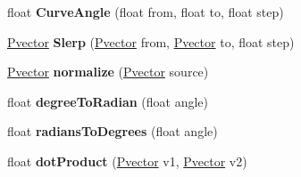 \begin{DoxyCompactItemize}
\item 
float {\bfseries Curve\+Angle} (float from, float to, float step)\hypertarget{class_missile_ab9be0dc0d69a7805e8802d85b0bac920}{}\label{class_missile_ab9be0dc0d69a7805e8802d85b0bac920}

\item 
\hyperlink{class_pvector}{Pvector} {\bfseries Slerp} (\hyperlink{class_pvector}{Pvector} from, \hyperlink{class_pvector}{Pvector} to, float step)\hypertarget{class_missile_a6b812375fab935579403dbc586c8bca3}{}\label{class_missile_a6b812375fab935579403dbc586c8bca3}

\item 
\hyperlink{class_pvector}{Pvector} {\bfseries normalize} (\hyperlink{class_pvector}{Pvector} source)\hypertarget{class_missile_adcfe8208a230cd62e99a4c01610d8dea}{}\label{class_missile_adcfe8208a230cd62e99a4c01610d8dea}

\item 
float {\bfseries degree\+To\+Radian} (float angle)\hypertarget{class_missile_a50407cc2ceac229a071a6ef9347bd671}{}\label{class_missile_a50407cc2ceac229a071a6ef9347bd671}

\item 
float {\bfseries radians\+To\+Degrees} (float angle)\hypertarget{class_missile_a5c053f8cd78416602048ef6bfc89efb8}{}\label{class_missile_a5c053f8cd78416602048ef6bfc89efb8}

\item 
float {\bfseries dot\+Product} (\hyperlink{class_pvector}{Pvector} v1, \hyperlink{class_pvector}{Pvector} v2)\hypertarget{class_missile_abfdfc0cd3e087ec5d8fc3f8382f9a42b}{}\label{class_missile_abfdfc0cd3e087ec5d8fc3f8382f9a42b}

\end{DoxyCompactItemize}
